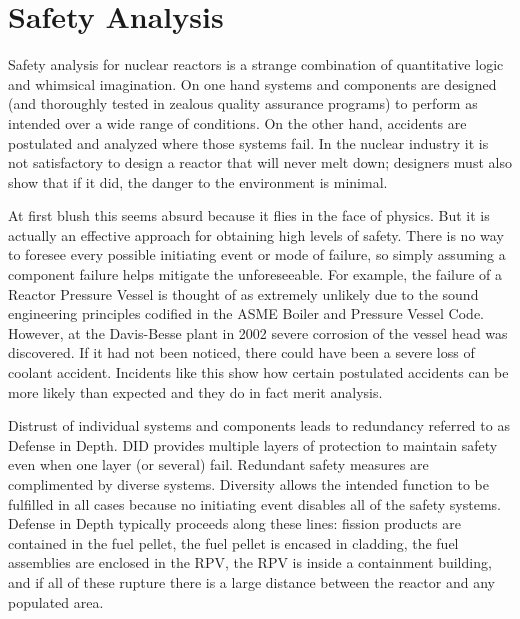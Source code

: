 

\section{Safety Analysis}

Safety analysis for nuclear reactors is a strange combination of quantitative logic and whimsical imagination.
On one hand systems and components are designed (and thoroughly tested in zealous quality assurance programs) to perform as intended over a wide range of conditions.
On the other hand, accidents are postulated and analyzed where those systems fail. 
In the nuclear industry it is not satisfactory to design a reactor that will never melt down;
designers must also show that if it did, the danger to the environment is minimal.

At first blush this seems absurd because it flies in the face of physics. 
But it is actually an effective approach for obtaining high levels of safety.
There is no way to foresee every possible initiating event or mode of failure, so simply assuming a component failure helps mitigate the unforeseeable. 
For example, the failure of a Reactor Pressure Vessel is thought of as extremely unlikely due to the sound engineering principles codified in the ASME Boiler and Pressure Vessel Code.
However, at the Davis-Besse plant in 2002 severe corrosion of the vessel head was discovered.
If it had not been noticed, there could have been a severe loss of coolant accident.
Incidents like this show how certain postulated accidents can be more likely than expected and they do in fact merit analysis.

Distrust of individual systems and components leads to redundancy referred to as Defense in Depth. DID provides multiple layers of protection to maintain safety even when one layer (or several) fail. Redundant safety measures are complimented by diverse systems. 
Diversity allows the intended function to be fulfilled in all cases because no initiating event disables all of the safety systems.
Defense in Depth typically proceeds along these lines: fission products are contained in the fuel pellet, the fuel pellet is encased in cladding, the fuel assemblies are enclosed in the RPV, the RPV is inside a containment building, and if all of these rupture there is a large distance between the reactor and any populated area.

